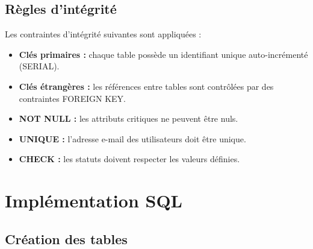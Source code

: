 \subsection{R\`egles d'int\'egrit\'e}

Les contraintes d'int\'egrit\'e suivantes sont appliqu\'ees :

\begin{itemize}
    \item \textbf{Cl\'es primaires :} chaque table poss\`ede un identifiant unique auto-incr\'ement\'e (SERIAL).
    \item \textbf{Cl\'es \'etrang\`eres :} les r\'ef\'erences entre tables sont contr\^ol\'ees par des contraintes FOREIGN KEY.
    \item \textbf{NOT NULL :} les attributs critiques ne peuvent \^etre nuls.
    \item \textbf{UNIQUE :} l'adresse e-mail des utilisateurs doit \^etre unique.
    \item \textbf{CHECK :} les statuts doivent respecter les valeurs d\'efinies.
\end{itemize}

\section{Impl\'ementation SQL}

\subsection{Cr\'eation des tables}

